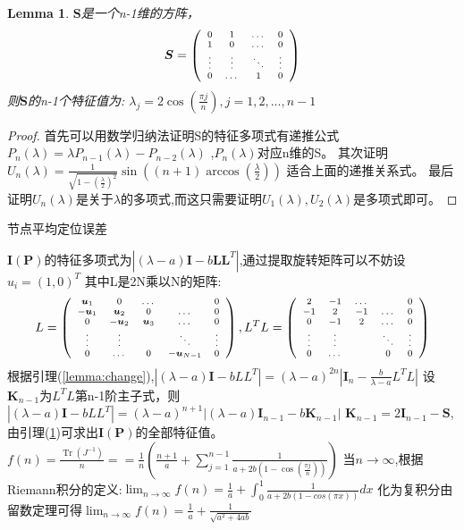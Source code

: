 \documentclass[notheorems,xetex,mathserif,serif]{beamer}
\newenvironment{changemargin}[2]{%
\begin{list}{}{%
\setlength{\topsep}{0pt}%
\setlength{\leftmargin}{#1}%
\setlength{\rightmargin}{#2}%
\setlength{\listparindent}{\parindent}%
\setlength{\itemindent}{\parindent}%
\setlength{\parsep}{\parskip}%
}%
\item[]}{\end{list}}
\DeclareMathOperator{\Tr}{Tr}
\newtheorem{lemma}{Lemma}
\begin{document}
\begin{frame}
\begin{lemma}\label{lemma:special}
$\bm{S}$是一个n-1维的方阵，\[
\scriptsize{\bm{S}=\left(
\begin{array}{cccc}
0&1&\dots&0\\
1&0&\dots&0\\
\vdots&\vdots&\ddots&\vdots\\
0&\dots&1&0\\
\end{array}\right)}
\]则$\bm{S}$的n-1个特征值为:
$\lambda_j=2\cos(\frac{\pi j}{n}),j=1,2,...,n-1$
\end{lemma}
\begin{proof}
首先可以用数学归纳法证明S的特征多项式有递推公式$P_n(\lambda)=\lambda P_{n-1}(\lambda)-P_{n-2}(\lambda)$
,$P_n(\lambda)$对应n维的S。
其次证明
$U_n(\lambda)=\frac{1}{\sqrt{1-(\frac{\lambda}{2})^2}}\sin((n+1)\arccos(\frac{\lambda}{2}))
$
适合上面的递推关系式。
最后证明$U_n(\lambda)$是关于$\lambda$的多项式,而这只需要证明$U_1(\lambda),U_2(\lambda)$是多项式即可。
\end{proof}
\end{frame}
\begin{frame}{节点平均定位误差}

\begin{changemargin}{-1cm}{-1cm}
$\bm{I}(\bm{P})$的特征多项式为$|(\lambda-a)\bm{I}-b\bm{L}\bm{L}^T|$,通过提取旋转矩阵可以不妨设$u_i=(1,0)^T$
其中L是2N乘以N的矩阵:
\[\scriptsize{
L=\left(
\begin{array}{ccccc}
\bm{u}_1&0&\dots&&0\\
-\bm{u}_1&\bm{u}_2&0&\dots&0\\
0&-\bm{u}_2&\bm{u}_3&\dots&0\\
\vdots &\vdots&&\ddots &\vdots\\
0&\dots&0&-\bm{u}_{N-1}&0\\
\end{array}
\right),L^TL=\left(
\begin{array}{ccccc}
2&-1&\dots&&0\\
-1&2&-1&\dots&0\\
0&-1&2&\dots&0\\
\vdots &\vdots&&\ddots &\vdots\\
0&\dots&&0&0\\
\end{array}
\right)}
\]
根据引理(\ref{lemma:change}),$|(\lambda-a)\bm{I}-bLL^T|=(\lambda-a)^{2n}|\bm{I}_n-\frac{b}{\lambda-a}L^TL|$
设$\bm{K}_{n-1}$为$L^TL$第n-1阶主子式，则
$|(\lambda-a)\bm{I}-bLL^T|=(\lambda-a)^{n+1}|(\lambda-a)\bm{I}_{n-1}-b\bm{K}_{n-1}|$
$\bm{K}_{n-1}=2\bm{I}_{n-1}-\bm{S}$,由引理(\ref{lemma:special})可求出$\bm{I}(\bm{P})$的全部特征值。
$f(n)=\frac{\Tr(J^{-1})}{n}==\frac{1}{n}(\frac{n+1}{a}+\sum_{j=1}^{n-1}\frac{1}{a+2b(1-\cos(\frac{\pi j}{n}))})$
当$n\to \infty$,根据Riemann积分的定义:$\lim_{n\rightarrow \infty}f(n)=\frac{1}{a}+\int_0^1 \frac{1}{a+2b(1-cos(\pi x))}dx$
化为复积分由留数定理可得$\lim_{n\rightarrow \infty}f(n)=\frac{1}{a}+\frac{1}{\sqrt{a^2+4ab}}$
\end{changemargin}
\end{frame}
\end{document}
